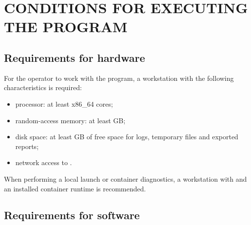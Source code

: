 \documentclass[12pt,a4paper]{extarticle}
\begin{document}
\clearpage

\section{CONDITIONS FOR EXECUTING THE PROGRAM}

\subsection{Requirements for hardware}

\begin{hseExample}
For the operator to work with the program, a workstation with the following characteristics is required:

\begin{itemize}[leftmargin=1.25cm]
    \item processor: at least  x86\_64 cores;
    \item random-access memory: at least  GB;
    \item disk space: at least  GB of free space for logs, temporary files and exported reports;
    \item network access to .
\end{itemize}

When performing a local launch or container diagnostics, a workstation with  and an installed container runtime is recommended.
\end{hseExample}

\subsection{Requirements for software}
\end{document}
